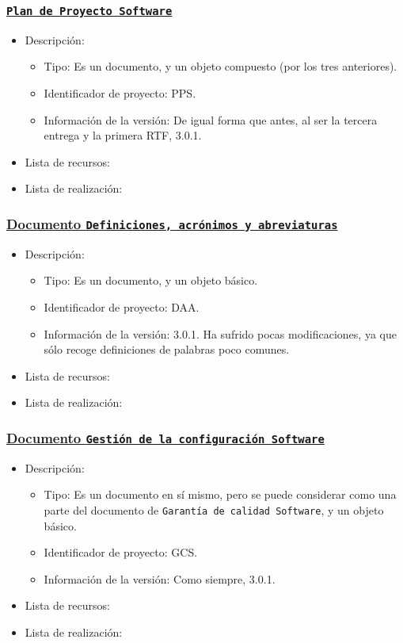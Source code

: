 \documentclass[spanish,a4paper,11pt, twoside]{report}	%
\begin{document}
			\subsubsection{\underline{\texttt{Plan de Proyecto Software}}}
			\begin{itemize}	
				\item{Descripción:}
					\begin{itemize}	
						\item{Tipo:} Es un documento, y un objeto compuesto (por los tres anteriores). 
						\item{Identificador de proyecto:} PPS.
						\item{Información de la versión:} De igual forma que antes, al ser la tercera entrega y la primera RTF, 3.0.1.
					\end{itemize}	
				\item{Lista de recursos:}
				\item{Lista de realización:}
			\end{itemize}	

			\subsubsection{\underline{Documento \texttt{Definiciones, acrónimos y abreviaturas}}}
			\begin{itemize}	
				\item{Descripción:}
					\begin{itemize}	
						\item{Tipo:} Es un documento, y un objeto básico. 
						\item{Identificador de proyecto:} DAA.
						\item{Información de la versión:} 3.0.1. Ha sufrido pocas modificaciones, ya que sólo recoge definiciones de palabras poco comunes.
					\end{itemize}	
				\item{Lista de recursos:}
				\item{Lista de realización:}
			\end{itemize}		

			\subsubsection{\underline{Documento \texttt{Gestión de la configuración Software}}}
			\begin{itemize}	
				\item{Descripción:}
					\begin{itemize}	
						\item{Tipo:} Es un documento en sí mismo, pero se puede considerar como una parte del documento de \texttt{Garantía de calidad Software}, y un objeto básico. 
						\item{Identificador de proyecto:} GCS.
						\item{Información de la versión:} Como siempre, 3.0.1.
					\end{itemize}	
				\item{Lista de recursos:}
				\item{Lista de realización:}
			\end{itemize}	
\end{document}
